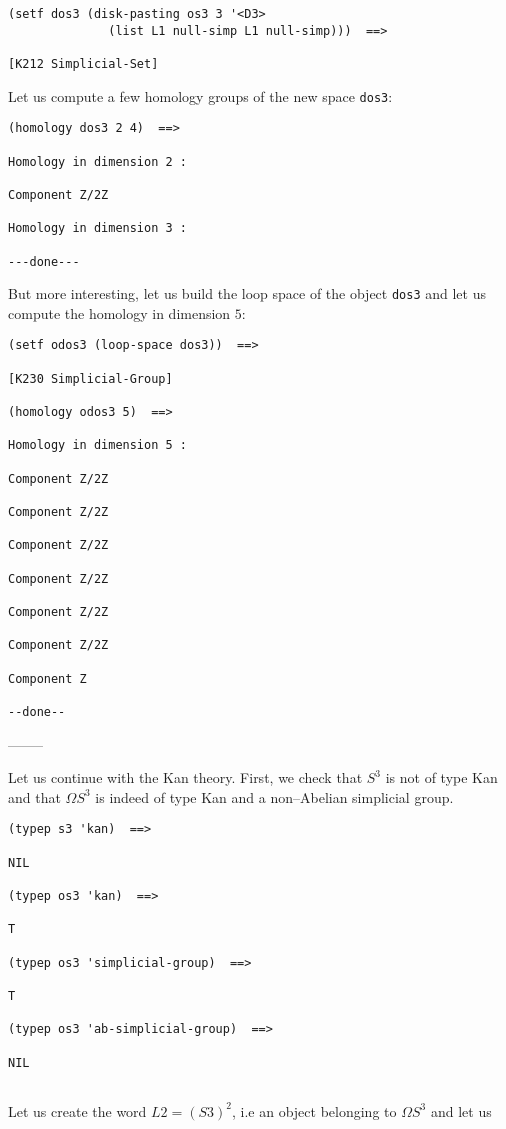 {\footnotesize\begin{verbatim}
(setf dos3 (disk-pasting os3 3 '<D3>
              (list L1 null-simp L1 null-simp)))  ==>

[K212 Simplicial-Set]
\end{verbatim}}
Let us compute a few homology groups of the new space {\tt dos3}:
{\footnotesize\begin{verbatim}
(homology dos3 2 4)  ==>

Homology in dimension 2 :

Component Z/2Z

Homology in dimension 3 :

---done---
\end{verbatim}}
But more interesting, let us  build the  loop space of the object {\tt dos3} and
let us compute  the ho\-mo\-lo\-gy in dimension $5$:
{\footnotesize\begin{verbatim}
(setf odos3 (loop-space dos3))  ==>

[K230 Simplicial-Group]

(homology odos3 5)  ==>

Homology in dimension 5 :

Component Z/2Z

Component Z/2Z

Component Z/2Z

Component Z/2Z

Component Z/2Z

Component Z/2Z

Component Z

--done--
\end{verbatim}}
\begin{center}
--------
\end{center}
Let us continue with the Kan theory. First, we check that $S^3$ is not of type Kan and that $\Omega S^3$
is indeed of type Kan and a non--Abelian simplicial group.
{\footnotesize\begin{verbatim}
(typep s3 'kan)  ==>

NIL

(typep os3 'kan)  ==>

T

(typep os3 'simplicial-group)  ==>

T

(typep os3 'ab-simplicial-group)  ==>

NIL


\end{verbatim}}
Let us create the word $L2=(S3)^2$, i.e an object belonging to $\Omega S^3$ and let us
